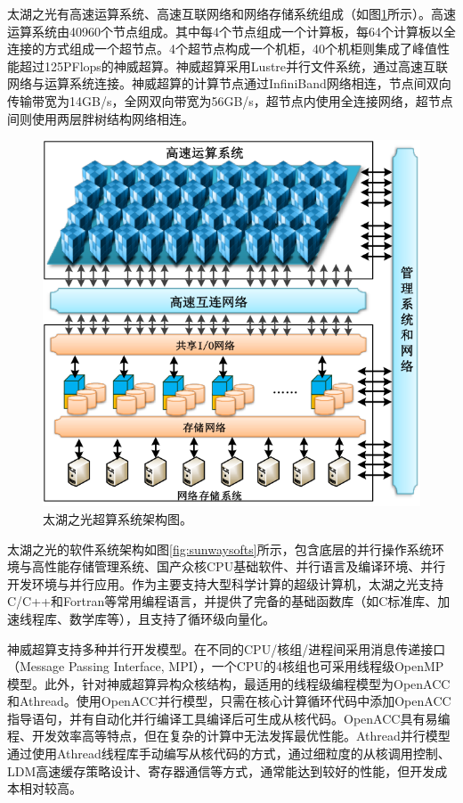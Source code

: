 \documentclass[degree=doctor]{thuthesis}
\begin{document}
太湖之光有高速运算系统、高速互联网络和网络存储系统组成（如图\ref{fig:sunwayarch}所示）。高速运算系统由40960个节点组成。其中每4个节点组成一个计算板，每64个计算板以全连接的方式组成一个超节点。4个超节点构成一个机柜，40个机柜则集成了峰值性能超过125PFlops的神威超算。神威超算采用Lustre并行文件系统，通过高速互联网络与运算系统连接。神威超算的计算节点通过InfiniBand网络相连，节点间双向传输带宽为14GB/s，全网双向带宽为56GB/s，超节点内使用全连接网络，超节点间则使用两层胖树结构网络相连。

\begin{figure}[ht]
\centering
\includegraphics[width=.8\columnwidth]{神威系统.png}
\caption{太湖之光超算系统架构图。}
\label{fig:sunwayarch}
\end{figure}

太湖之光的软件系统架构如图\ref{fig:sunwaysofts}所示，包含底层的并行操作系统环境与高性能存储管理系统、国产众核CPU基础软件、并行语言及编译环境、并行开发环境与并行应用。作为主要支持大型科学计算的超级计算机，太湖之光支持C/C++和Fortran等常用编程语言，并提供了完备的基础函数库（如C标准库、加速线程库、数学库等），且支持了循环级向量化。

神威超算支持多种并行开发模型。在不同的CPU/核组/进程间采用消息传递接口（Message Passing Interface, MPI），一个CPU的4核组也可采用线程级OpenMP模型。此外，针对神威超算异构众核结构，最适用的线程级编程模型为OpenACC和Athread。使用OpenACC并行模型，只需在核心计算循环代码中添加OpenACC指导语句，并有自动化并行编译工具编译后可生成从核代码。OpenACC具有易编程、开发效率高等特点，但在复杂的计算中无法发挥最优性能。Athread并行模型通过使用Athread线程库手动编写从核代码的方式，通过细粒度的从核调用控制、LDM高速缓存策略设计、寄存器通信等方式，通常能达到较好的性能，但开发成本相对较高。
\end{document}

